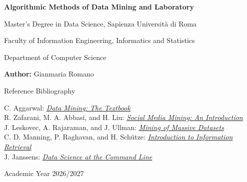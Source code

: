 \documentclass{report}
\begin{document}
\begin{titlepage}
    \centering
    \vspace*{2cm}
    
    {\Huge \bfseries Algorithmic Methods of Data Mining and Laboratory \par}
    \vspace{1.5cm}
    
    {\Large Master's Degree in Data Science, Sapienza Università di Roma \par}
    {\large Faculty of Information Engineering, Informatics and Statistics \par}
    \vspace{0.5cm}
    
    {\large Department of Computer Science \par}
    \vspace{3cm}
    
    {\Large \textbf{Author:} Gianmaria Romano \par}
    \vspace{3cm}

    {\Large Reference Bibliography \par}
    {\large C. Aggarwal: \href{https://www.charuaggarwal.net/Data-Mining.htm}{\textit{Data Mining: The Textbook}} \\
    R. Zafarani, M. A. Abbasi, and H. Liu: \href{https://dmml.asu.edu/smm/}{\textit{Social Media Mining: An Introduction}} \\
    J. Leskovec, A. Rajaraman, and J. Ullman: \href{http://www.mmds.org/}{\textit{Mining of Massive Datasets}} \\
    C. D. Manning, P. Raghavan, and H. Schütze: \href{https://www-nlp.stanford.edu/IR-book/}{\textit{Introduction to Information Retrieval}} \\
    J. Janssens: \href{https://github.com/jeroenjanssens/data-science-at-the-command-line}{\textit{Data Science at the Command Line}} \\}
    \vfill
    
    {\large Academic Year 2026/2027 \par}
    \vspace*{1cm}
\end{titlepage}

\clearpage
\end{document}

